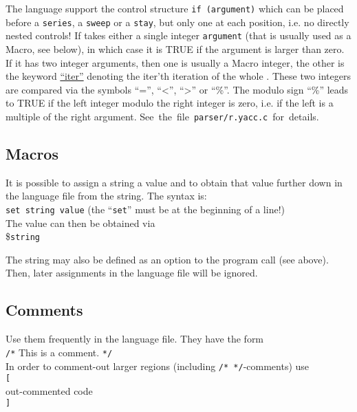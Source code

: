 \documentclass[12pt]{article}
\begin{document}
 The language support the control structure \texttt{if (argument)}
 which can be placed before a \texttt{series}, a \texttt{sweep} or a \texttt{stay}, but only one at each position, i.e. no directly nested controls!
 If takes either a single integer \texttt{argument} (that is usually used as a Macro, see below), in which case it is TRUE if the argument is larger than zero.
 If it has two integer arguments, then one is usually a Macro integer, the other is the keyword \underline{``iter''} denoting the iter'th iteration of the whole .
 These two integers are compared via the symbols ``='', ``<'', ``>'' or ``\%''.
 The modulo sign ``\%'' leads to TRUE if the left integer modulo the right integer is zero, i.e. if the left is a multiple of the right argument.
 {\footnotesize
 See~the~file~\texttt{parser/r.yacc.c}~for~details.
 }


\subsection{Macros}
 It is possible to assign a string a value and to obtain that value further down in the language file from the string.
 The syntax is:\\
 \hspace*{11mm} \texttt{set string value} \qquad (the ``\texttt{set}'' must be at the beginning of a line!) \\
 The value can then be obtained via\\
 \hspace*{11mm} \$\texttt{string}

 The string may also be defined as an option to the program call (see above).
 Then, later assignments in the language file will be ignored.


\subsection{Comments}
 Use them frequently in the language file. They have the form\\
 \hspace*{11mm} \texttt{/*} This is a comment. \texttt{*/} \\

 In order to comment-out larger regions (including \texttt{/* */}-comments) use \\
 \hspace*{11mm} \texttt{[} \\
 \hspace*{11mm} out-commented code \\
 \hspace*{11mm} \texttt{]}
\end{document}
